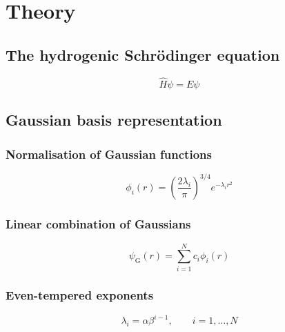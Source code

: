 
\chapter{Theory}

\section{The hydrogenic Schrödinger equation}



\begin{equation}
    \hat H\psi=E\psi
    \label{eq:schrodinger}
\end{equation}



\section{Gaussian basis representation}

\subsection{Normalisation of Gaussian functions}



\begin{equation}
    \phi_i(r)=
    \left(\frac{2\lambda_i}{\pi}\right)^{3/4}
    e^{-\lambda_i r^2}
    \label{eq:normalised_gaussian}
\end{equation}



\subsection{Linear combination of Gaussians}



\begin{equation}
    \psi_{\mathrm G}(r)=
    \sum_{i=1}^{N}c_i\phi_i(r)
    \label{eq:gaussian_expansion}
\end{equation}


\subsection{Even-tempered exponents}


\begin{equation}
    \lambda_i=\alpha\beta^{i-1},
    \qquad i=1,\ldots,N
    \label{eq:even_tempered}
\end{equation}


